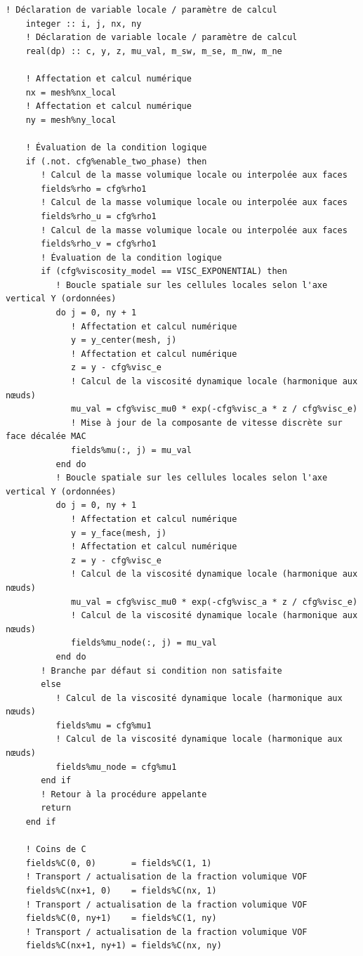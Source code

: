 \documentclass[10pt,a4paper,oneside]{book}
\begin{document}
\begin{lstlisting}[language={[95]Fortran}]
    ! Déclaration de variable locale / paramètre de calcul
    integer :: i, j, nx, ny
    ! Déclaration de variable locale / paramètre de calcul
    real(dp) :: c, y, z, mu_val, m_sw, m_se, m_nw, m_ne

    ! Affectation et calcul numérique
    nx = mesh%nx_local
    ! Affectation et calcul numérique
    ny = mesh%ny_local

    ! Évaluation de la condition logique
    if (.not. cfg%enable_two_phase) then
       ! Calcul de la masse volumique locale ou interpolée aux faces
       fields%rho = cfg%rho1
       ! Calcul de la masse volumique locale ou interpolée aux faces
       fields%rho_u = cfg%rho1
       ! Calcul de la masse volumique locale ou interpolée aux faces
       fields%rho_v = cfg%rho1
       ! Évaluation de la condition logique
       if (cfg%viscosity_model == VISC_EXPONENTIAL) then
          ! Boucle spatiale sur les cellules locales selon l'axe vertical Y (ordonnées)
          do j = 0, ny + 1
             ! Affectation et calcul numérique
             y = y_center(mesh, j)
             ! Affectation et calcul numérique
             z = y - cfg%visc_e
             ! Calcul de la viscosité dynamique locale (harmonique aux nœuds)
             mu_val = cfg%visc_mu0 * exp(-cfg%visc_a * z / cfg%visc_e)
             ! Mise à jour de la composante de vitesse discrète sur face décalée MAC
             fields%mu(:, j) = mu_val
          end do
          ! Boucle spatiale sur les cellules locales selon l'axe vertical Y (ordonnées)
          do j = 0, ny + 1
             ! Affectation et calcul numérique
             y = y_face(mesh, j)
             ! Affectation et calcul numérique
             z = y - cfg%visc_e
             ! Calcul de la viscosité dynamique locale (harmonique aux nœuds)
             mu_val = cfg%visc_mu0 * exp(-cfg%visc_a * z / cfg%visc_e)
             ! Calcul de la viscosité dynamique locale (harmonique aux nœuds)
             fields%mu_node(:, j) = mu_val
          end do
       ! Branche par défaut si condition non satisfaite
       else
          ! Calcul de la viscosité dynamique locale (harmonique aux nœuds)
          fields%mu = cfg%mu1
          ! Calcul de la viscosité dynamique locale (harmonique aux nœuds)
          fields%mu_node = cfg%mu1
       end if
       ! Retour à la procédure appelante
       return
    end if

    ! Coins de C
    fields%C(0, 0)       = fields%C(1, 1)
    ! Transport / actualisation de la fraction volumique VOF
    fields%C(nx+1, 0)    = fields%C(nx, 1)
    ! Transport / actualisation de la fraction volumique VOF
    fields%C(0, ny+1)    = fields%C(1, ny)
    ! Transport / actualisation de la fraction volumique VOF
    fields%C(nx+1, ny+1) = fields%C(nx, ny)


\end{lstlisting}
\end{document}
